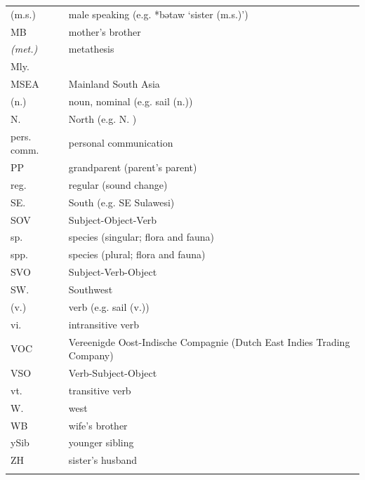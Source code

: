 {\begin{xltabular}{\textwidth}[l]{l>{\raggedright\arraybackslash}X}
(m.s.)	&	male speaking (e.g. *bətaw ‘sister (m.s.)’)	\\
MB	&	mother's brother	\\
\it{(met.)}	&	metathesis	\\
Mly.	&		\\
MSEA	&	Mainland South Asia	\\
(n.)	&	noun, nominal (e.g. sail (n.))	\\
N.	&	North (e.g. N. )	\\
pers. comm.	&	personal communication	\\
PP	&	grandparent (parent's parent)	\\
reg.	&	regular (sound change)	\\
SE.	&	South (e.g. SE Sulawesi)	\\
SOV	&	Subject-Object-Verb	\\
sp.	&	species (singular; flora and fauna)	\\
spp.	&	species (plural; flora and fauna)	\\
SVO	&	Subject-Verb-Object	\\
SW.	&	Southwest	\\
(v.)	&	verb (e.g.  sail (v.))	\\
vi.	&	intransitive verb	\\
VOC	&	Vereenigde Oost-Indische Compagnie (Dutch East Indies Trading Company)	\\
VSO	&	Verb-Subject-Object	\\
vt.	&	transitive verb	\\
W.	&	west	\\
WB	&	wife’s brother	\\
ySib	&	younger sibling	\\
ZH	&	sister’s husband	\\
\lspbottomrule
\end{xltabular}}


